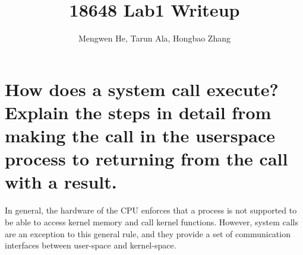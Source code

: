 \documentclass[letterpaper,10pt]{article}
\title{\textbf{18648 Lab1 Writeup}}
\author{Mengwen He, Tarun Ala, Hongbao Zhang}
\begin{document}
\maketitle

\section{How does a system call execute? Explain the steps in detail from making the call in the userspace process to returning from the call with a result.}

In general, the hardware of the CPU enforces that a process is not supported to be able to access kernel memory and call kernel functions. However, system calls are an exception to this general rule, and they provide a set of communication interfaces between user-space and kernel-space.
\end{document}
